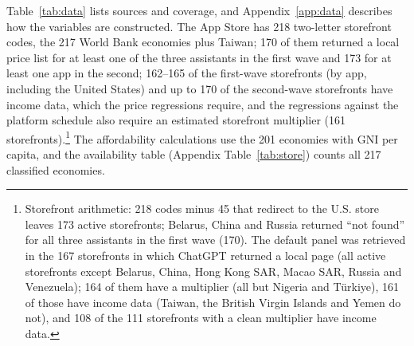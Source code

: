 \documentclass[11pt]{article}
\theoremstyle{definition}
\theoremstyle{remark}
\begin{document}
Table~\ref{tab:data} lists sources and coverage, and Appendix~\ref{app:data} describes how the variables are constructed. The App Store has 218 two-letter storefront codes, the 217 World Bank economies plus Taiwan; 170 of them returned a local price list for at least one of the three assistants in the first wave and 173 for at least one app in the second; 162--165 of the first-wave storefronts (by app, including the United States) and up to 170 of the second-wave storefronts have income data, which the price regressions require, and the regressions against the platform schedule also require an estimated storefront multiplier (161 storefronts).\footnote{Storefront arithmetic: 218 codes minus 45 that redirect to the U.S. store leaves 173 active storefronts; Belarus, China and Russia returned ``not found'' for all three assistants in the first wave (170). The default panel was retrieved in the 167 storefronts in which ChatGPT returned a local page (all active storefronts except Belarus, China, Hong Kong SAR, Macao SAR, Russia and Venezuela); 164 of them have a multiplier (all but Nigeria and T\"urkiye), 161 of those have income data (Taiwan, the British Virgin Islands and Yemen do not), and 108 of the 111 storefronts with a clean multiplier have income data.} The affordability calculations use the 201 economies with GNI per capita, and the availability table (Appendix Table~\ref{tab:store}) counts all 217 classified economies.
\end{document}
